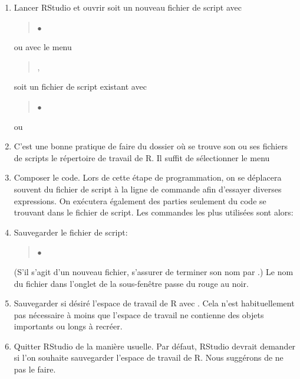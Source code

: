\begin{enumerate}
\item Lancer RStudio et ouvrir soit un nouveau fichier de script avec
  \begin{quote}
     $\bullet$ 
  \end{quote}
  ou avec le menu
  \begin{quote}
    ,
  \end{quote}
  soit un fichier de script existant avec
  \begin{quote}
     $\bullet$ 
  \end{quote}
  ou
  \begin{quote}
  \end{quote}
\item C'est une bonne pratique de faire du dossier où se trouve son ou
  ses fichiers de scripts le répertoire de travail de R. Il suffit de
  sélectionner le menu
  \begin{quote}
  \end{quote}
\item Composer le code. Lors de cette étape de programmation, on se
  déplacera souvent du fichier de script à la ligne de commande afin
  d'essayer diverses expressions. On exécutera également des parties
  seulement du code se trouvant dans le fichier de script. Les
  commandes les plus utilisées sont alors:
  \begin{quote}
  \end{quote}
\item Sauvegarder le fichier de script:
  \begin{quote}
     $\bullet$ 
  \end{quote}
  (S'il s'agit d'un nouveau fichier, s'assurer de terminer son nom par
  .) Le nom du fichier dans l'onglet de la sous-fenêtre passe
  du rouge au noir.
\item Sauvegarder si désiré l'espace de travail de R avec
  . Cela n'est
  habituellement pas nécessaire à moins que l'espace de travail ne
  contienne des objets importants ou longs à recréer.
\item Quitter RStudio de la manière usuelle. Par défaut, RStudio
  devrait demander si l'on souhaite sauvegarder l'espace de travail de
  R. Nous suggérons de ne pas le faire.


\end{enumerate}
